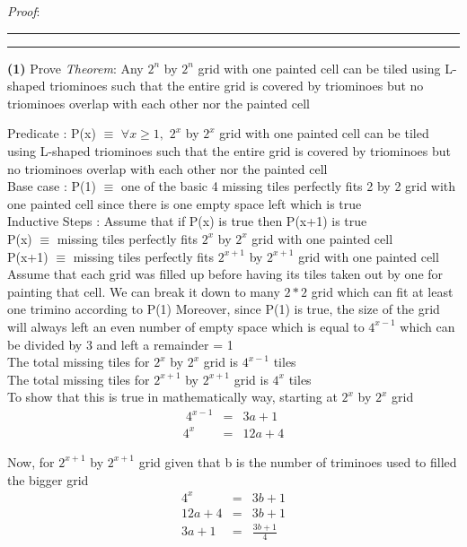\documentclass[a4paper, 11pt]{article}
\newcommand{\question}[2] {\vspace{.25in} \hrule\vspace{0.5em}
	\noindent{\bf #1: #2} \vspace{0.5em}
	\hrule \vspace{.10in}}
\renewcommand{\part}[1] {\vspace{.10in} {\bf (#1)}}
\begin{document}
	{\em Proof}:
	
	\question{3}{Spacing}
	\part{1} Prove {\em Theorem}:
	Any $2^n$ by $2^n$ grid with one painted cell can be tiled using L-shaped triominoes such that the entire grid is covered by triominoes but no triominoes overlap with each other nor the painted cell
	
	Predicate : P(x) $\equiv$ $\forall x \geq 1,$ $2^x$ by $2^x$ grid with one painted cell can be tiled using L-shaped triominoes such that the entire grid is covered by triominoes but no triominoes overlap with each other nor the painted cell  \\
	
	Base case : P(1) $\equiv$ one of the basic 4 missing tiles perfectly fits 2 by 2 grid with one painted cell since there is one empty space left which is true\\
	
	Inductive Steps : Assume that if P(x) is true then P(x+1) is true\\
	P(x)  $\equiv$ missing tiles perfectly fits $2^x$ by $2^x$ grid with one painted cell\\
	P(x+1) 	$\equiv$ missing tiles perfectly fits $2^{x+1}$ by $2^{x+1}$ grid with one painted cell\\
	
	Assume that each grid was filled up before having its tiles taken out by one for painting that cell. We can break it down to many $2*2$ grid which can fit at least one trimino according to P(1) Moreover, since P(1) is true, the size of the grid will always left an even number of empty space which is equal to $4^{x-1}$ which can be divided by 3 and left a remainder = 1\\
	
	The total missing tiles for $2^x$ by $2^x$ grid is $4^{x-1}$ tiles\\
	The total missing tiles for $2^{x+1}$ by $2^{x+1}$ grid is $4^{x}$ tiles\\
	
	
	To show that this is true in mathematically way, starting at $2^x$ by $2^x$ grid
	\begin{eqnarray}\
	4^{x-1} &=& 3a+1\\
	4^x &=& 12a+4
	\end{eqnarray}
	
	Now, for $2^{x+1}$ by $2^{x+1}$ grid given that b is the number of triminoes used to filled the bigger grid
	\begin{eqnarray}
	4^{x} &=& 3b+1\\
	12a+4 &=& 3b+1\\
	3a+1 &=& \frac{3b+1}{4}
	\end{eqnarray}
	
\end{document}
